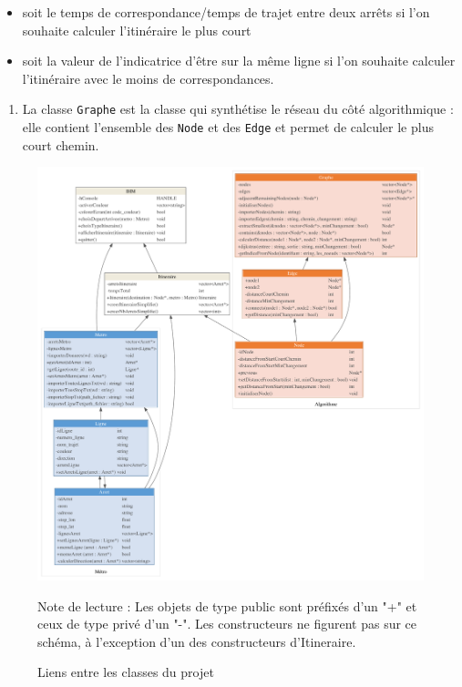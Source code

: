 \documentclass[,french]{article}
\providecommand{\tightlist}{%
  \setlength{\itemsep}{0pt}\setlength{\parskip}{0pt}}
\begin{document}
\begin{itemize}
\tightlist
\item
  soit le temps de correspondance/temps de trajet entre deux arrêts si
  l'on souhaite calculer l'itinéraire le plus court
\item
  soit la valeur de l'indicatrice d'être sur la même ligne si l'on
  souhaite calculer l'itinéraire avec le moins de correspondances.
\end{itemize}

\begin{enumerate}
\def\labelenumi{\arabic{enumi}.}
\setcounter{enumi}{2}
\tightlist
\item
  La classe \texttt{Graphe} est la classe qui synthétise le réseau du
  côté algorithmique : elle contient l'ensemble des \texttt{Node} et des
  \texttt{Edge} et permet de calculer le plus court chemin.
\end{enumerate}

\begin{figure}[H]
\includegraphics{img/Diagramme_classes/diagramme_classes.pdf}
\captionsetup{margin=0cm,format=hang,justification=justified}
\caption{Liens entre les classes du projet}\label{fig:diag_classes}

 \footnotesize
Note de lecture : Les objets de type public sont préfixés d'un "+" et ceux de type privé d'un "-". 
Les constructeurs ne figurent pas sur ce schéma, à l'exception d'un des constructeurs d'Itineraire. 
\end{figure}
\end{document}
